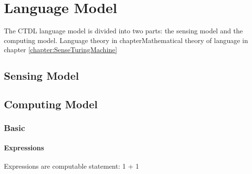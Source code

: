 \chapter{Language Model}
The CTDL language model is divided into two parts: the sensing model and the computing model. Language theory in chapterMathematical theory of language in chapter \ref{chapter:SenseTuringMachine}
\section{Sensing Model}

\subsection{}

\subsection{}

\section{Computing Model}
\subsection{Basic}
\subsubsection{Expressions}
Expressions are computable statement:
1 + 1